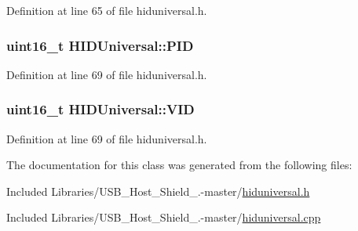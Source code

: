 \-Definition at line 65 of file hiduniversal.\-h.

\hypertarget{class_h_i_d_universal_abc609e49d66fa6260e7cdcd2c4ff0a5a}{
\subsubsection[{\-P\-I\-D}]{\setlength{\rightskip}{0pt plus 5cm}uint16\-\_\-t {\bf \-H\-I\-D\-Universal\-::\-P\-I\-D}}}\label{class_h_i_d_universal_abc609e49d66fa6260e7cdcd2c4ff0a5a}


\-Definition at line 69 of file hiduniversal.\-h.

\hypertarget{class_h_i_d_universal_a7f2123d1f20327600bb9e49a1ef5b0c7}{
\subsubsection[{\-V\-I\-D}]{\setlength{\rightskip}{0pt plus 5cm}uint16\-\_\-t {\bf \-H\-I\-D\-Universal\-::\-V\-I\-D}}}\label{class_h_i_d_universal_a7f2123d1f20327600bb9e49a1ef5b0c7}


\-Definition at line 69 of file hiduniversal.\-h.



\-The documentation for this class was generated from the following files\-:\begin{DoxyCompactItemize}
\item 
\-Included Libraries/\-U\-S\-B\-\_\-\-Host\-\_\-\-Shield\-\_.-\/master/\hyperlink{hiduniversal_8h}{hiduniversal.\-h}\item 
\-Included Libraries/\-U\-S\-B\-\_\-\-Host\-\_\-\-Shield\-\_.-\/master/\hyperlink{hiduniversal_8cpp}{hiduniversal.\-cpp}\end{DoxyCompactItemize}
